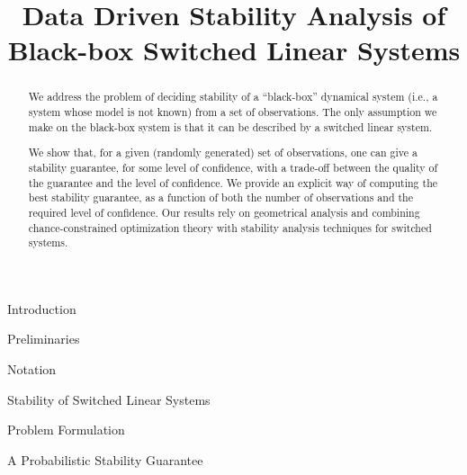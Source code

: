 \documentclass[letterpaper,11pt]{paper}
\title{Data Driven Stability Analysis of Black-box Switched Linear Systems}
\begin{document}
\maketitle

\begin{abstract}
We address the problem of deciding stability of a ``black-box'' dynamical system (i.e., a system whose model is not known) from a set of observations. The only assumption we make on the black-box system is that it can be described by a switched linear system. 

We show that, for a given (randomly generated) set of observations, one can give a stability guarantee, for some level of confidence, with a trade-off between the quality of the guarantee and the level of confidence. We provide an explicit way of computing the best stability guarantee, as a function of both the number of observations and the required level of confidence. Our results rely on geometrical analysis and combining chance-constrained optimization theory with stability analysis techniques for switched systems.
\end{abstract}

\begin{section}{Introduction}

\end{section}

\begin{section}{Preliminaries}
\label{sec:preliminaries}
\begin{subsection}{Notation}
 
\end{subsection}
\begin{subsection}{Stability of Switched Linear Systems}\label{sec:stab}

\end{subsection}
\begin{subsection}{Problem Formulation}

\end{subsection}
\end{section}

\begin{section}{A Probabilistic Stability Guarantee}
\label{sec:upperbound}


\end{section}

%
%
%

%
\end{document}
